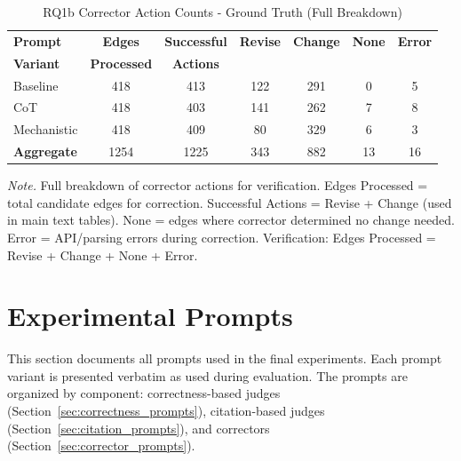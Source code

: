 \begin{table}[H]
\centering
\caption{RQ1b Corrector Action Counts - Ground Truth (Full Breakdown)}
\label{tab:rq1b_action_counts_groundtruth}
\begin{threeparttable}
\begin{tabular}{lcccccc}
\toprule
\textbf{Prompt} & \textbf{Edges} & \textbf{Successful} & \textbf{Revise} & \textbf{Change} & \textbf{None} & \textbf{Error} \\
\textbf{Variant} & \textbf{Processed} & \textbf{Actions} & & & & \\
\midrule
Baseline & 418 & 413 & 122 & 291 & 0 & 5 \\
CoT & 418 & 403 & 141 & 262 & 7 & 8 \\
Mechanistic & 418 & 409 & 80 & 329 & 6 & 3 \\
\midrule
\textbf{Aggregate} & 1254 & 1225 & 343 & 882 & 13 & 16 \\
\bottomrule
\end{tabular}
\begin{tablenotes}
\small
\item \textit{Note.} Full breakdown of corrector actions for verification. 
Edges Processed = total candidate edges for correction.
Successful Actions = Revise + Change (used in main text tables).
None = edges where corrector determined no change needed.
Error = API/parsing errors during correction.
Verification: Edges Processed = Revise + Change + None + Error.
\end{tablenotes}
\end{threeparttable}
\end{table}



\section{Experimental Prompts}
\label{sec:appendix_prompts}

This section documents all prompts used in the final experiments. Each prompt variant is presented verbatim as used during evaluation. The prompts are organized by component: correctness-based judges (Section~\ref{sec:correctness_prompts}), citation-based judges (Section~\ref{sec:citation_prompts}), and correctors (Section~\ref{sec:corrector_prompts}).

